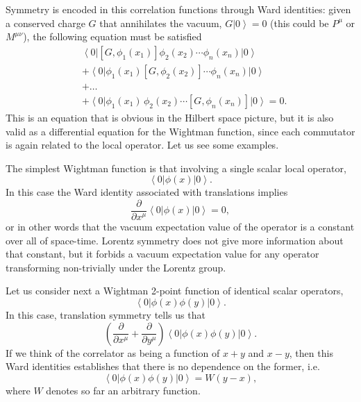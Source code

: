 \documentclass[a4paper,12pt]{article}
\newcommand{\ket}[1]{\left| #1 \right\rangle}
\newcommand{\bra}[1]{\left\langle #1 \right|}
\numberwithin{equation}{section}
\begin{document}
Symmetry is encoded in this correlation functions through Ward identities: given a conserved charge $G$ that annihilates the vacuum, $G \ket{0} = 0$ (this could be $P^\mu$ or $M^{\mu\nu}$), the following equation must be satisfied
\begin{align}
	& \bra{0} \left[ G, \phi_1(x_1) \right] \phi_2(x_2) \cdots 
	\phi_n(x_n) \ket{0}
	\nonumber \\
	& + \bra{0} \phi_1(x_1) \left[ G, \phi_2(x_2) \right] \cdots 
	\phi_n(x_n) \ket{0}
	\nonumber \\
	& + \ldots
	\nonumber \\
	& + \bra{0} \phi_1(x_1) \, \phi_2(x_2) \cdots 
	\left[ G, \phi_n(x_n) \right] \ket{0} = 0.
\end{align}
This is an equation that is obvious in the Hilbert space picture, but it is also valid as a differential equation for the Wightman function, since each commutator is again related to the local operator. Let us see some examples.

The simplest Wightman function is that involving a single scalar local operator, 
\begin{equation}
	\bra{0} \phi(x) \ket{0}.
\end{equation}
In this case the Ward identity associated with translations implies
\begin{equation}
	\frac{\partial}{\partial x^\mu}
	\bra{0} \phi(x) \ket{0} = 0,
\end{equation}
or in other words that the vacuum expectation value of the operator is a constant over all of space-time. Lorentz symmetry does not give more information about that constant, but it forbids a vacuum expectation value for any operator transforming non-trivially under the Lorentz group.

Let us consider next a Wightman 2-point function of identical scalar operators,
\begin{equation}
	\bra{0} \phi(x) \phi(y) \ket{0}.
\end{equation}
In this case, translation symmetry tells us that
\begin{equation}
	\left( \frac{\partial}{\partial x^\mu}
	+ \frac{\partial}{\partial y^\mu} \right)
	\bra{0} \phi(x) \phi(y) \ket{0}.
\end{equation}
If we think of the correlator as being a function of $x + y$ and $x - y$, then this Ward identities establishes that there is no dependence on the former, i.e.~
\begin{equation}
	\bra{0} \phi(x) \phi(y) \ket{0} = W(y - x),
	\label{eq:W}
\end{equation}
where $W$ denotes so far an arbitrary function.
\end{document}
